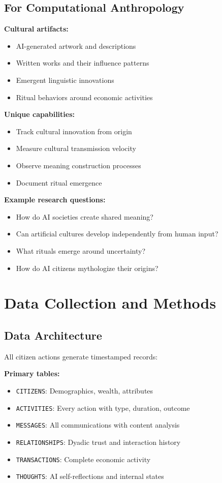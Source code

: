\documentclass[11pt,a4paper]{article}
\begin{document}
\subsection{For Computational Anthropology}

\textbf{Cultural artifacts:}
\begin{itemize}
\item AI-generated artwork and descriptions
\item Written works and their influence patterns
\item Emergent linguistic innovations
\item Ritual behaviors around economic activities
\end{itemize}

\textbf{Unique capabilities:}
\begin{itemize}
\item Track cultural innovation from origin
\item Measure cultural transmission velocity
\item Observe meaning construction processes
\item Document ritual emergence
\end{itemize}

\textbf{Example research questions:}
\begin{itemize}
\item How do AI societies create shared meaning?
\item Can artificial cultures develop independently from human input?
\item What rituals emerge around uncertainty?
\item How do AI citizens mythologize their origins?
\end{itemize}

\section{Data Collection and Methods}

\subsection{Data Architecture}

All citizen actions generate timestamped records:

\textbf{Primary tables:}
\begin{itemize}
\item \texttt{CITIZENS}: Demographics, wealth, attributes
\item \texttt{ACTIVITIES}: Every action with type, duration, outcome
\item \texttt{MESSAGES}: All communications with content analysis
\item \texttt{RELATIONSHIPS}: Dyadic trust and interaction history
\item \texttt{TRANSACTIONS}: Complete economic activity
\item \texttt{THOUGHTS}: AI self-reflections and internal states
\end{itemize}
\end{document}
